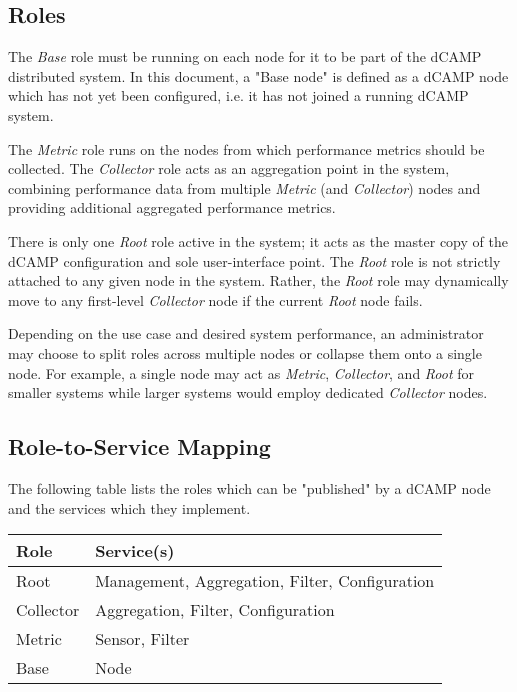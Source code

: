 \subsection{Roles}

The \textit{Base} role must be running on each node for it to be part of the dCAMP distributed system. In this document,
a "Base node" is defined as a dCAMP node which has not yet been configured, i.e. it has not joined a running dCAMP
system.

The \textit{Metric} role runs on the nodes from which performance metrics should be collected. The \textit{Collector}
role acts as an aggregation point in the system, combining performance data from multiple \textit{Metric} (and
\textit{Collector}) nodes and providing additional aggregated performance metrics.

There is only one \textit{Root} role active in the system; it acts as the master copy of the dCAMP configuration and
sole user-interface point. The \textit{Root} role is not strictly attached to any given node in the system. Rather, the
\textit{Root} role may dynamically move to any first-level \textit{Collector} node if the current \textit{Root} node
fails.

Depending on the use case and desired system performance, an administrator may choose to split roles across multiple
nodes or collapse them onto a single node. For example, a single node may act as \textit{Metric}, \textit{Collector},
and \textit{Root} for smaller systems while larger systems would employ dedicated \textit{Collector} nodes.

\subsection{Role-to-Service Mapping}

The following table lists the roles which can be "published" by a dCAMP node and the services which they implement.

\begin{tabular}{|l|l|}

\hline
\textbf{Role} & \textbf{Service(s)} \\
\hline
Root & Management, Aggregation, Filter, Configuration \\
\hline
Collector & Aggregation, Filter, Configuration \\
\hline
Metric & Sensor, Filter \\
\hline
Base & Node \\
\hline

\end{tabular}

